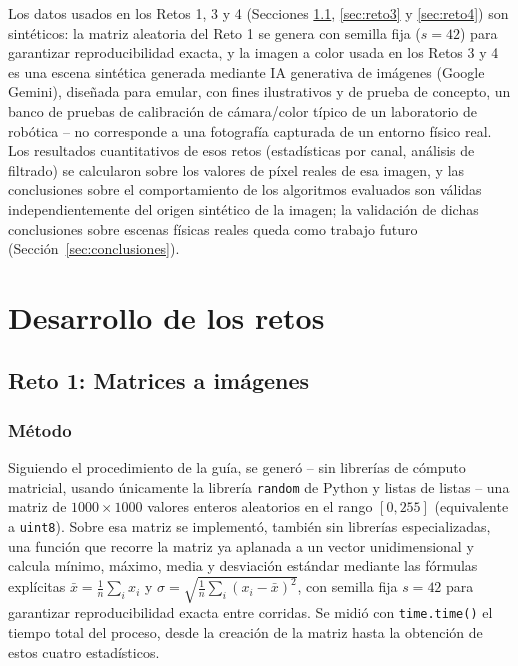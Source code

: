 \documentclass[11pt]{article}
\begin{document}
Los datos usados en los Retos 1, 3 y 4 (Secciones
\ref{sec:reto1}, \ref{sec:reto3} y \ref{sec:reto4}) son sintéticos:
la matriz aleatoria del Reto 1 se genera con semilla fija
($s=42$) para garantizar reproducibilidad exacta, y la imagen a color usada
en los Retos 3 y 4 es una escena sintética generada mediante IA
generativa de imágenes (Google Gemini), diseñada para emular, con fines
ilustrativos y de prueba de concepto, un banco de pruebas de calibración de
cámara/color típico de un laboratorio de robótica -- no corresponde a una
fotografía capturada de un entorno físico real. Los resultados cuantitativos
de esos retos (estadísticas por canal, análisis de filtrado) se
calcularon sobre los valores de píxel reales de esa imagen, y las
conclusiones sobre el comportamiento de los algoritmos evaluados son válidas
independientemente del origen sintético de la imagen; la validación de
dichas conclusiones sobre escenas físicas reales queda como trabajo futuro
(Sección~\ref{sec:conclusiones}).

\section{Desarrollo de los retos}

\subsection{Reto 1: Matrices a imágenes}
\label{sec:reto1}

\subsubsection{Método}
Siguiendo el procedimiento de la guía, se generó -- sin librerías de
cómputo matricial, usando únicamente la librería \texttt{random} de Python
y listas de listas -- una matriz de $1000\times 1000$ valores enteros
aleatorios en el rango $[0,255]$ (equivalente a \texttt{uint8}). Sobre esa
matriz se implementó, también sin librerías especializadas, una función
que recorre la matriz ya aplanada a un vector unidimensional y calcula
mínimo, máximo, media y desviación estándar mediante las fórmulas
explícitas $\bar{x} = \frac{1}{n}\sum_i x_i$ y
$\sigma = \sqrt{\frac{1}{n}\sum_i (x_i - \bar{x})^2}$, con semilla fija
$s=42$ para garantizar reproducibilidad exacta entre corridas. Se midió con
\texttt{time.time()} el tiempo total del proceso, desde la creación de la
matriz hasta la obtención de estos cuatro estadísticos.
\end{document}
